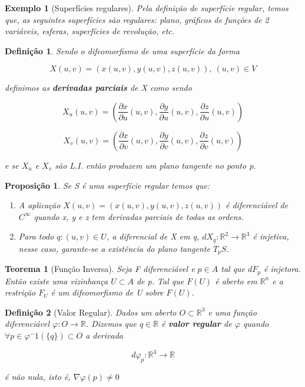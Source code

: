 \documentclass[12pt]{article}
\newtheorem{prop}{Proposição}
\newtheorem{ex}{Exemplo}[section]
\newtheorem{theorem}{Teorema}
\newtheorem{definition}{Definição}
\begin{document}
\begin{ex}[Superfícies regulares]
Pela definição de superfície regular, temos que, as seguintes superfícies são regulares: plano, gráficos de funções de 2 variáveis, esferas, superfícies de revolução, etc.
\end{ex}

\begin{definition}
Sendo o difeomorfismo de uma superfície da forma

$$X(u, v) = (x(u, v), y(u, v), z(u, v)),\ (u,v) \in V$$

definimos as \textbf{derivadas parciais} de X como sendo

$$X_u(u, v) = \left( \frac{\partial x}{\partial u}(u, v), \frac{\partial y}{\partial u}(u, v), \frac{\partial z}{\partial u}(u, v) \right)$$

$$X_v(u, v) = \left( \frac{\partial x}{\partial v}(u, v), \frac{\partial y}{\partial v}(u, v), \frac{\partial z}{\partial v}(u, v) \right)$$

e se $X_u$ e $X_v$ são L.I. então produzem um plano tangente no ponto p.
\end{definition}

\begin{prop}
Se S é uma superfície regular temos que:

\begin{enumerate}[label=(\alph*)]
    \item A aplicação $X(u, v) = (x(u, v), y(u, v), z(u, v))$ é diferenciável de $C^\infty$ quando x, y e z tem derivadas parciais de todas as ordens.
    
    \item Para todo $q: (u, v) \in U$, a diferencial de X em q, $dX_q: \mathbb{R}^2 \rightarrow \mathbb{R}^3$ é injetiva, nesse caso, garante-se a existência do plano tangente $T_p S$.
\end{enumerate}
\end{prop}

\begin{theorem}[Função Inversa]
Seja F diferenciável e $p \in A$ tal que $dF_p$ é injetora. Então existe uma vizinhança $U \subset A$ de p. Tal que $F(U)$ é aberto em $\mathbb{R}^n$ e a restrição $F_U$ é um difeomorfismo de U sobre $F(U)$.
\end{theorem}

\begin{definition}[Valor Regular]
Dados um aberto $O \subset \mathbb{R}^3$ e uma função diferenciável $\varphi: O \rightarrow \mathbb{R}$. Dizemos que $q \in \mathbb{R}$ é \textbf{valor regular} de $\varphi$ quando $\forall p \in \varphi^-1(\{q\}) \subset O$ a derivada

$$d\varphi_p: \mathbb{R}^3 \rightarrow \mathbb{R}$$

é não nula, isto é, $\nabla \varphi(p) \neq 0$
\end{definition}
\end{document}
